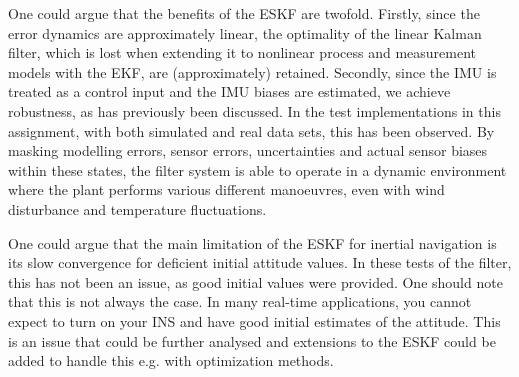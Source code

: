 
One could argue that the benefits of the ESKF are twofold. Firstly, since the error dynamics are approximately linear, the optimality of the linear Kalman filter, which is lost when extending it to nonlinear process and measurement models with the EKF, are (approximately) retained. Secondly, since the IMU is treated as a control input and the IMU biases are estimated, we achieve robustness, as has previously been discussed. In the test implementations in this assignment, with both simulated and real data sets, this has been observed. By masking modelling errors, sensor errors, uncertainties and actual sensor biases within these states, the filter system is able to operate in a dynamic environment where the plant performs various different manoeuvres, even with wind disturbance and temperature fluctuations.

One could argue that the main limitation of the ESKF for inertial navigation is its slow convergence for deficient initial attitude values. In these tests of the filter, this has not been an issue, as good initial values were provided. One should note that this is not always the case. In many real-time applications, you cannot expect to turn on your INS and have good initial estimates of the attitude. This is an issue that could be further analysed and extensions to the ESKF could be added to handle this e.g. with optimization methods.
